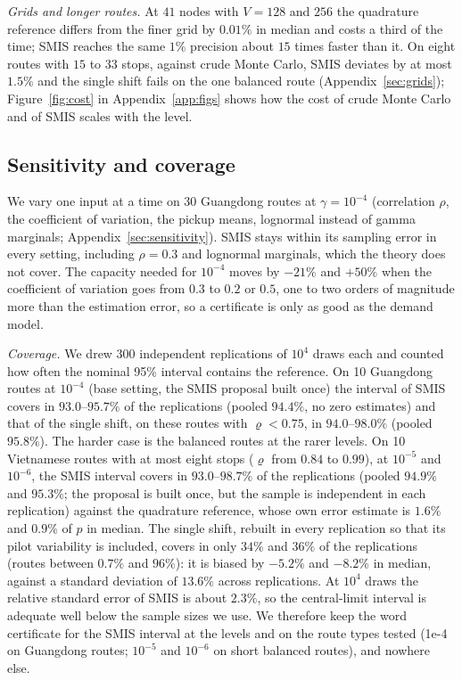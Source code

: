 \documentclass[ijoc,sglanonrev]{informs4}
\begin{document}
\emph{Grids and longer routes.} At $41$ nodes with $V=128$ and $256$ the
quadrature reference differs from the finer grid by $0.01\%$ in median and costs
a third of the time; SMIS reaches the same $1\%$ precision about $15$ times faster
than it. On eight routes with $15$ to $33$ stops, against crude Monte Carlo,
SMIS deviates by at most $1.5\%$ and the single shift fails on the one balanced
route (Appendix~\ref{sec:grids}); Figure~\ref{fig:cost} in Appendix~\ref{app:figs} shows how the cost of crude Monte Carlo and of SMIS scales with the level.

\subsection{Sensitivity and coverage}
\label{sec:sensitivitymain}
We vary one input at a time on 30 Guangdong routes at $\gamma=10^{-4}$
(correlation $\rho$, the coefficient of variation, the pickup means, lognormal
instead of gamma marginals; Appendix~\ref{sec:sensitivity}). SMIS stays within its
sampling error in every setting, including $\rho=0.3$ and lognormal marginals,
which the theory does not cover. The capacity needed for $10^{-4}$ moves by
$-21\%$ and $+50\%$ when the coefficient of variation goes from $0.3$ to $0.2$
or $0.5$, one to two orders of magnitude more than the estimation error, so a
certificate is only as good as the demand model.

\emph{Coverage.} We drew 300 independent replications of $10^4$ draws each and
counted how often the nominal 95\% interval contains the reference. On 10
Guangdong routes at $10^{-4}$ (base setting, the SMIS proposal built once) the
interval of SMIS covers in $93.0$--$95.7\%$ of the replications (pooled
$94.4\%$, no zero estimates) and that of the single shift, on these routes with
$\varrho<0.75$, in $94.0$--$98.0\%$ (pooled $95.8\%$). The harder case is the
balanced routes at the rarer levels. On 10 Vietnamese routes with at most
eight stops ($\varrho$ from $0.84$ to $0.99$), at $10^{-5}$ and $10^{-6}$, the
SMIS interval covers in $93.0$--$98.7\%$ of the replications (pooled $94.9\%$
and $95.3\%$; the proposal is built once, but the sample is independent in
each replication) against the quadrature reference, whose own error estimate is
$1.6\%$ and $0.9\%$ of $p$ in median. The single shift, rebuilt in every
replication so that its pilot variability is included, covers in only
$34\%$ and $36\%$ of the replications (routes between $0.7\%$ and
$96\%$): it is biased by $-5.2\%$ and $-8.2\%$ in median, against a standard
deviation of $13.6\%$ across replications. At $10^4$ draws the relative
standard error of SMIS is about $2.3\%$, so the central-limit interval is
adequate well below the sample sizes we use. We therefore keep the word
certificate for the SMIS interval at the levels and on the route types tested
(1e-4 on Guangdong routes; $10^{-5}$ and $10^{-6}$ on short balanced
routes), and nowhere else.
\end{document}
